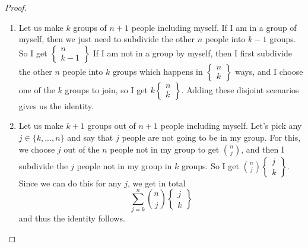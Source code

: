 \begin{proof}
    \begin{enumerate}
        \item Let us make $k$ groups of $n+1$ people including myself. If I am in a group of myself, then we just need to subdivide the other $n$ people into $k-1$ groups. So I get $\begin{Bmatrix} n\\ k-1\end{Bmatrix}$ If I am not in a group by myself, then I first subdivide the other $n$ people into $k$ groups which happens in $\begin{Bmatrix} n\\ k\end{Bmatrix}$ ways, and I choose one of the $k$ groups to join, so I get $k\begin{Bmatrix} n\\ k\end{Bmatrix}$. Adding these disjoint scenarios gives us the identity.
        \item Let us make $k+1$ groups out of $n+1$ people including myself. Let's pick any $j\in \{k,...,n\}$ and say that $j$ people are not going to be in my group. For this, we choose $j$ out of the $n$ people not in my group to get $\binom{n}{j}$, and then I subdivide the $j$ people not in my group in $k$ groups. So I get $\binom{n}{j}\begin{Bmatrix} j\\ k\end{Bmatrix}$. Since we can do this for any $j$, we get in total
        $$\sum_{j=k}^n \binom{n}{j}\begin{Bmatrix} j\\ k\end{Bmatrix}$$
        and thus the identity follows.
    \end{enumerate}
\end{proof}


